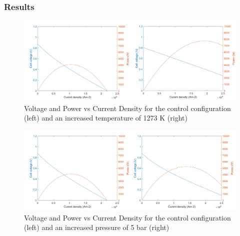     \subsubsection{Results}
    \begin{figure}[h]
        \centering
        \includegraphics[scale=0.59]{controlvsinc_temp.png}
        \caption{Voltage and Power vs Current Density for the control configuration (left) and an increased temperature of 1273 K (right)}
        \label{LMfig:SOFCtempinc}
    \end{figure}
      \begin{figure}[h]
        \centering
        \includegraphics[scale=0.59]{controlvsinc_pres.png}
        \caption{Voltage and Power vs Current Density for the control configuration (left) and an increased pressure of 5 bar (right)}
        \label{LMfig:SOFCpresinc}
    \end{figure}
    
